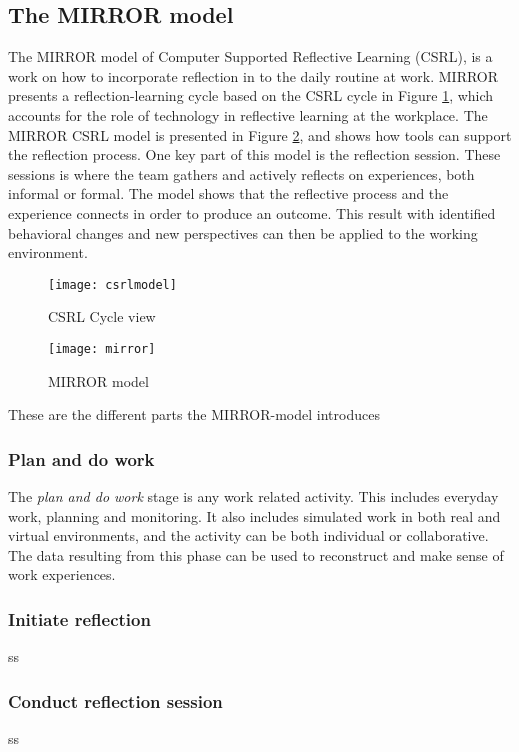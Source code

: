 \subsection{The MIRROR model}
\label{mirrorsection}
The MIRROR model of Computer Supported Reflective Learning (CSRL), is a work on how to incorporate reflection in to the daily routine at work. 
MIRROR presents a reflection-learning cycle based on the CSRL cycle in Figure \ref{csrlmodel}, which accounts for the role of technology in reflective learning at the workplace. The MIRROR CSRL model is presented in Figure \ref{mirrormodel}, and shows how tools can support the reflection process. One key part of this model is the reflection session. These sessions is where the team gathers and actively reflects on experiences, both informal or formal. The model shows that the reflective process and the experience connects in order to produce an outcome. This result with identified behavioral changes and new perspectives can then be applied to the working environment. 
\begin{figure}[!htpb]
\label{csrlmodel}
\centering
	\texttt{[image: csrlmodel]}
\caption{CSRL Cycle view}
\end{figure}

\begin{figure}[!htpb]
\centering
	\texttt{[image: mirror]}
\caption{MIRROR model}
\label{mirrormodel}
\end{figure}
These are the different parts the MIRROR-model introduces
\subsubsection{Plan and do work}
The \emph{plan and do work} stage is any work related activity. This includes everyday work, planning and monitoring. It also includes simulated work in both real and virtual environments, and the activity can be both individual or collaborative. The data resulting from this phase can be used to reconstruct and make sense of work experiences. 

\subsubsection{Initiate reflection}
ss

\subsubsection{Conduct reflection session}
ss

